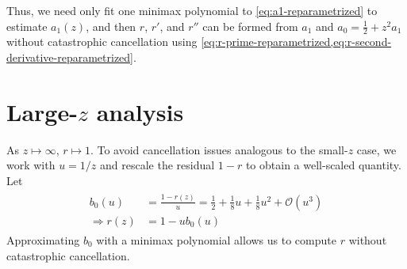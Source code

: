 \documentclass{article}
\begin{document}
Thus, we need only fit one minimax polynomial to \cref{eq:a1-reparametrized} to estimate $a_1(z)$, and then $r$, $r'$, and $r''$ can be formed from $a_1$ and $a_0 = \frac{1}{2} + z^2 a_1$ without catastrophic cancellation using \cref{eq:r-prime-reparametrized,eq:r-second-derivative-reparametrized}.



\section{Large-$z$ analysis}\label{sec:rician-large-z}

As $z \mapsto \infty$, $r \mapsto 1$.
To avoid cancellation issues analogous to the small-$z$ case, we work with $u=1/z$ and rescale the residual $1-r$ to obtain a well-scaled quantity.
Let
%
\begin{align}
  \boxed{
    \begin{aligned}
      b_0(u)           & = \frac{1-r(z)}{u} = \frac{1}{2} + \frac{1}{8} u + \frac{1}{8} u^2 + \mathcal{O}(u^3) \\
      \Rightarrow r(z) & = 1 - u b_0(u) \label{eq:r-large-reparametrized}
    \end{aligned}
  }
\end{align}
%
Approximating $b_0$ with a minimax polynomial allows us to compute $r$ without catastrophic cancellation.
\end{document}
